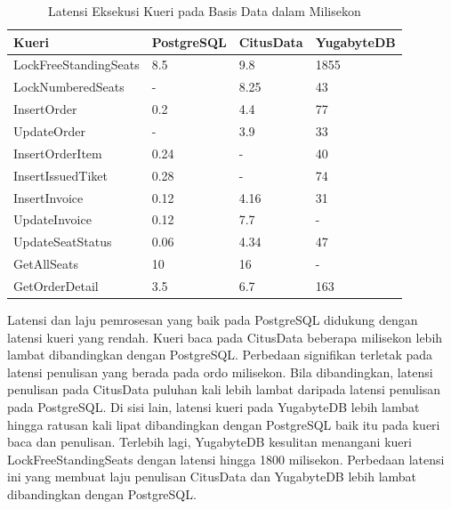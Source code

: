 \begin{table}[h]
    \centering
    \caption{Latensi Eksekusi Kueri pada Basis Data dalam Milisekon}
    \begin{tabular}{|l|l|l|l|}
        \hline
        \textbf{Kueri}        & \textbf{PostgreSQL} & \textbf{CitusData} & \textbf{YugabyteDB} \\
        \hline
        LockFreeStandingSeats & 8.5                 & 9.8                & 1855                \\
        \hline
        LockNumberedSeats     & -                   & 8.25               & 43                  \\
        \hline
        InsertOrder           & 0.2                 & 4.4                & 77                  \\
        \hline
        UpdateOrder           & -                   & 3.9                & 33                  \\
        \hline
        InsertOrderItem       & 0.24                & -                  & 40                  \\
        \hline
        InsertIssuedTiket     & 0.28                & -                  & 74                  \\
        \hline
        InsertInvoice         & 0.12                & 4.16               & 31                  \\
        \hline
        UpdateInvoice         & 0.12                & 7.7                & -                   \\
        \hline
        UpdateSeatStatus      & 0.06                & 4.34               & 47                  \\
        \hline
        GetAllSeats           & 10                  & 16                 & -                   \\
        \hline
        GetOrderDetail        & 3.5                 & 6.7                & 163                 \\
        \hline
    \end{tabular}
\end{table}

Latensi dan laju pemrosesan yang baik pada PostgreSQL didukung dengan latensi kueri yang rendah. Kueri baca pada CitusData beberapa milisekon lebih lambat dibandingkan dengan PostgreSQL. Perbedaan signifikan terletak pada latensi penulisan yang berada pada ordo milisekon. Bila dibandingkan, latensi penulisan pada CitusData puluhan kali lebih lambat daripada latensi penulisan pada PostgreSQL. Di sisi lain, latensi kueri pada YugabyteDB lebih lambat hingga ratusan kali lipat dibandingkan dengan PostgreSQL baik itu pada kueri baca dan penulisan. Terlebih lagi, YugabyteDB kesulitan menangani kueri LockFreeStandingSeats dengan latensi hingga 1800 milisekon. Perbedaan latensi ini yang membuat laju penulisan CitusData dan YugabyteDB lebih lambat dibandingkan dengan PostgreSQL.

